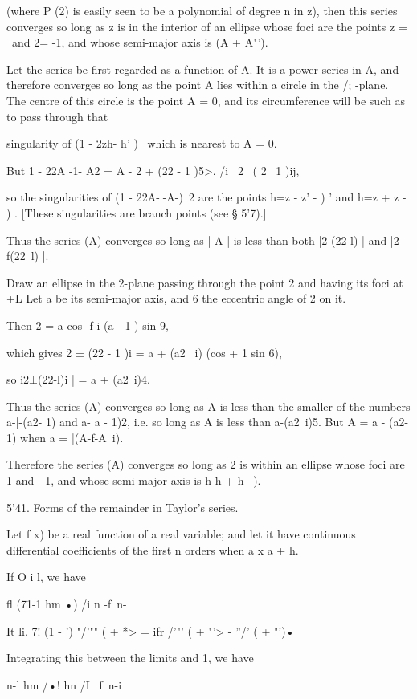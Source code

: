 {{(where P (2) is easily seen to be a polynomial of degree n in z), then
this series converges so long as z is in the interior of an ellipse
whose foci are the points z = \ and 2= -1, and whose semi-major axis
is (A + A"').

Let the series be first regarded as a function of A. It is a power
series in A, and therefore converges so long as the point A lies
within a circle in the /; -plane. The centre of this circle is the
point A = 0, and its circumference will be such as to pass through
that

singularity of (1 - 2zh- h' )~ which is nearest to A = 0.

But 1 - 22A -1- A2 = A - 2 + (22 - 1 )5>. /i \ 2 \ ( 2 \ 1 )ij,

so the singularities of (1 - 22A-|-A-)~2 are the points h=z - z' - ) '
and h=z + z - ) . [These singularities are branch points (see § 5'7).]

Thus the series (A) converges so long as | A | is less than both
|2-(22-l) | and |2-f(22\ l) |.

Draw an ellipse in the 2-plane passing through the point 2 and having
its foci at +L Let a be its semi-major axis, and 6 the eccentric angle
of 2 on it.

Then 2 = a cos -f i (a - 1 ) sin 9,

which gives 2 ± (22 - 1 )i = a + (a2 \ i) (cos + 1 sin 6),

so i2±(22-l)i | = a + (a2\ i)4.

Thus the series (A) converges so long as A is less than the smaller of
the numbers a-|-(a2- 1) and a- a - 1)2, i.e. so long as A is less than
a-(a2\ i)5. But A = a - (a2- 1) when a = |(A-f-A~i).

Therefore the series (A) converges so long as 2 is within an ellipse
whose foci are 1 and - 1, and whose semi-major axis is h h + h~ ).

5'41. Forms of the remainder in Taylor's series.

Let f x) be a real function of a real variable; and let it have
continuous differential coefficients of the first n orders when a x a
+ h.

If O i l, we have

fl (71-1 hm •) /i n -f\ n-\

It li. 7! (1 - ') "/'"" ( + *> = ifr /'"' ( + "'> - ''/' ( + "')•

Integrating this between the limits and 1, we have

n-l hm /•! hn /I \ f\ n-i

}}
